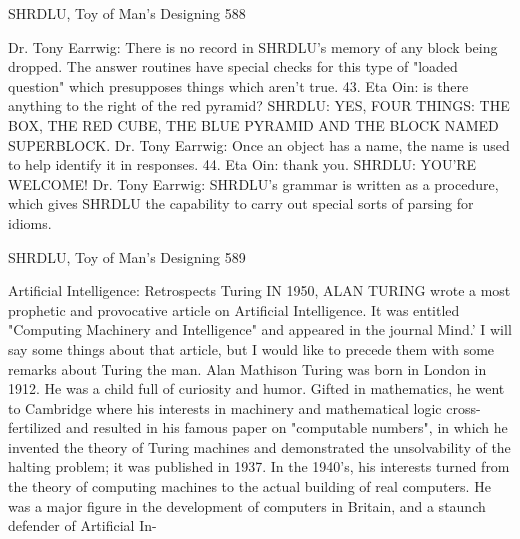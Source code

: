 {SHRDLU, Toy of Man's Designing                                                       588

        Dr. Tony Earrwig: There is no record in SHRDLU's memory of any block being
        dropped. The answer routines have special checks for this type of "loaded
        question" which presupposes things which aren't true.
43. Eta Oin: is there anything to the right of the red pyramid?
        SHRDLU: YES, FOUR THINGS: THE BOX, THE RED CUBE, THE BLUE
        PYRAMID AND THE BLOCK NAMED SUPERBLOCK.
        Dr. Tony Earrwig: Once an object has a name, the name is used to help identify it
        in responses.
44. Eta Oin: thank you.
        SHRDLU: YOU'RE WELCOME!
        Dr. Tony Earrwig: SHRDLU's grammar is written as a procedure, which gives
        SHRDLU the capability to carry out special sorts of parsing for
        idioms.




SHRDLU, Toy of Man's Designing                                                       589


                            Artificial Intelligence:
                                 Retrospects
                                       Turing
                                            IN 1950, ALAN TURING wrote a most
                                            prophetic and provocative article on
                                            Artificial Intelligence. It was entitled
                                            "Computing          Machinery          and
                                            Intelligence" and appeared in the journal
                                            Mind.' I will say some things about that
                                            article, but I would like to precede them
                                            with some remarks about Turing the
                                            man.
                                            Alan Mathison Turing was born in
                                            London in 1912. He was a child full of
                                            curiosity and humor. Gifted in
                                            mathematics, he went to Cambridge
                                            where his interests in machinery and
                                            mathematical logic cross-fertilized and
                                            resulted in his famous paper on
                                            "computable numbers", in which he
                                            invented the theory of Turing machines
                                            and demonstrated the unsolvability of
                                            the halting problem; it was published in
                                            1937. In the 1940's, his interests turned
                                            from the theory of computing machines
                                            to the actual building of real computers.
                                            He was a major figure in the
                                            development of computers in Britain,
                                            and a staunch defender of Artificial In-

}
